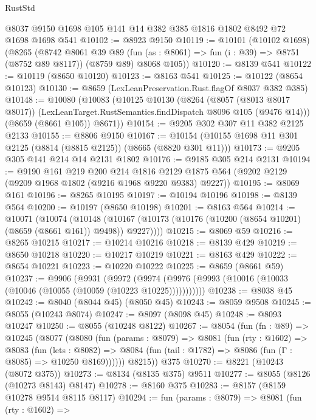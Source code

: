 \begin{lexlean}{RustStd}
\begin{coremodule}
    @8037
    @9150
    @1698
    @105
    @141
    @14
    @382
    @385
    @1816
    @1802
    @8492
    @72
    @1698
    @1698
    @541
@10102 := @8923 @9150
@10119 := @10101
    (@10102 @1698)
    (@8265
      (@8742
        @8061
        @39
        @89
        (fun (as : @8061) => fun (i : @39) => @8751 (@8752 @89 @8117))
        (@8759 @89)
        @8068
        @105))
@10120 := @8139 @541
@10122 := @10119 (@8650 @10120)
@10123 := @8163 @541
@10125 := @10122 (@8654 @10123)
@10130 := @8659 (LexLeanPreservation.Rust.flagOf @8037 @382 @385)
@10148 := @10080
    (@10083
      (@10125
        @10130
        (@8264
          (@8057 (@8013 @8017 @8017))
          (LexLeanTarget.RustSemantics.findDispatch @8096 @105 (@9476 @14)))
        (@8659 (@8661 @105))
        @8671))
@10154 := @9205 @302 @307 @11 @382 @2125 @2133
@10155 := @8806 @9150
@10167 := @10154 (@10155 @1698 @11 @301 @2125 (@8814 (@8815 @2125)) (@8665 (@8820 @301 @11)))
@10173 := @9205 @305 @141 @214 @14 @2131 @1802
@10176 := @9185 @305 @214 @2131
@10194 := @9190
    @161
    @219
    @200
    @214
    @1816
    @2129
    @1875
    @564
    (@9202 @2129 (@9209 @1968 @1802 (@9216 @1968 @9220 @9383) @9227))
@10195 := @8069 @161
@10196 := @8265 @10195
@10197 := @10194 @10196
@10198 := @8139 @564
@10200 := @10197 (@8650 @10198)
@10201 := @8163 @564
@10214 := @10071
    (@10074
      (@10148 (@10167 (@10173 (@10176 (@10200 (@8654 @10201) (@8659 (@8661 @161)) @9498)) @9227))))
@10215 := @8069 @59
@10216 := @8265 @10215
@10217 := @10214 @10216
@10218 := @8139 @429
@10219 := @8650 @10218
@10220 := @10217 @10219
@10221 := @8163 @429
@10222 := @8654 @10221
@10223 := @10220 @10222
@10225 := @8659 (@8661 @59)
@10237 := @9906
    (@9931
      (@9972 (@9974 (@9976 (@9993 (@10016 (@10033 (@10046 (@10055 (@10059 (@10223 @10225)))))))))))
@10238 := @8038 @45
@10242 := @8040 (@8044 @45) (@8050 @45)
@10243 := @8059 @9508
@10245 := @8055 (@10243 @8074)
@10247 := @8097 (@8098 @45)
@10248 := @8093 @10247
@10250 := @8055 (@10248 @8122)
@10267 := @8054
    (fun (fn : @89) =>
    @10245
      (@8077
        (@8080
          (fun (params : @8079) =>
          @8081
            (fun (rty : @1602) =>
            @8083
              (fun (lets : @8082) =>
              @8084 (fun (tail : @1782) => @8086 (fun (Γ : @8085) => @10250 @8169))))))
        @8215))
    @375
@10270 := @8221 (@10243 (@8072 @375))
@10273 := @8134 (@8135 @375) @9511
@10277 := @8055 (@8126 (@10273 @8143) @8147)
@10278 := @8160 @375
@10283 := @8157 (@8159 @10278 @9514 @8115 @8117)
@10294 := fun (params : @8079) =>
  @8081
    (fun (rty : @1602) =>

\end{coremodule}
\end{lexlean}
